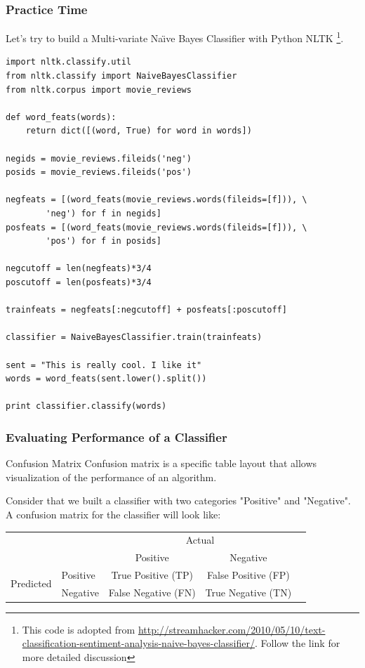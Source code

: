 \documentclass[serif,11pt,aspectratio=1610,table]{beamer}
\begin{document}
\begin{frame}[fragile]
 \frametitle{Practice Time}
\footnotesize
Let's try to build a Multi-variate Na\"{\i}ve Bayes Classifier with Python NLTK \footnote{This code is adopted from \url{http://streamhacker.com/2010/05/10/text-classification-sentiment-analysis-naive-bayes-classifier/}. Follow the link for more detailed discussion}.
\tiny
\begin{verbatim}
import nltk.classify.util
from nltk.classify import NaiveBayesClassifier
from nltk.corpus import movie_reviews

def word_feats(words):
    return dict([(word, True) for word in words])

negids = movie_reviews.fileids('neg')
posids = movie_reviews.fileids('pos')

negfeats = [(word_feats(movie_reviews.words(fileids=[f])), \
        'neg') for f in negids]
posfeats = [(word_feats(movie_reviews.words(fileids=[f])), \
        'pos') for f in posids]

negcutoff = len(negfeats)*3/4
poscutoff = len(posfeats)*3/4

trainfeats = negfeats[:negcutoff] + posfeats[:poscutoff]

classifier = NaiveBayesClassifier.train(trainfeats)

sent = "This is really cool. I like it"
words = word_feats(sent.lower().split())

print classifier.classify(words)
\end{verbatim}

\end{frame}

\begin{frame}[fragile]
 \frametitle{Evaluating Performance of a Classifier}
\begin{block}{Confusion Matrix}
 Confusion matrix is a specific table layout that allows visualization of the performance of an algorithm.
\end{block}
\vspace{.5cm}
Consider that we built a classifier with two categories "Positive" and "Negative". A confusion matrix for the classifier will look like: \\
\vspace{.5cm}
\footnotesize
\begin{tabular}{|l|l|c|c|c}
 \cline{3-4}
 \multicolumn{2}{c|}{}& \multicolumn{2}{c|}{Actual}&\\
 \cline{3-4}
 \multicolumn{2}{c|}{}&Positive&Negative&\\
 \cline{1-4}
 \multirow{2}{*}{Predicted}& Positive & \cellcolor{orange!25} True Positive (TP) & False Positive (FP) & \\
 \cline{2-4}
 & Negative & False Negative (FN) & \cellcolor{orange!25} True Negative (TN) & \\
 \cline{1-4}
 \end{tabular}
\end{frame}
\end{document}
